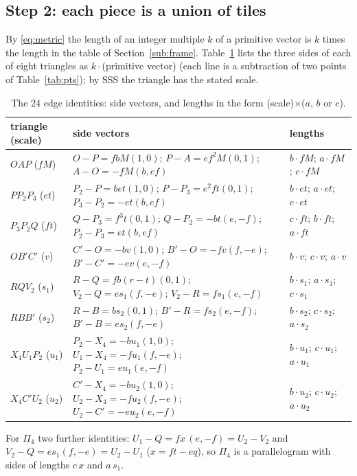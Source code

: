 \documentclass[11pt,reqno]{amsart}
\theoremstyle{plain}
\theoremstyle{definition}
\begin{document}
\subsection{Step 2: each piece is a union of tiles}\label{sub:tiles}
By \eqref{eq:metric} the length of an integer multiple $k$ of a primitive vector is $k$ times the length in the table of Section~\ref{sub:frame}. Table~\ref{tab:sides} lists the three sides of each of eight triangles as $k\cdot$(primitive vector) (each line is a subtraction of two points of Table~\ref{tab:pts}); by SSS the triangle has the stated scale.
\begin{table}[ht]
\centering\small
\caption{The $24$ edge identities: side vectors, and lengths in the form (scale)$\times$($a$, $b$ or $c$).}\label{tab:sides}
\begin{tabular}{@{}p{2.5cm}p{7.2cm}p{2.9cm}@{}}
\toprule
triangle (scale) & side vectors & lengths\\
\midrule
$OAP$ ($fM$) & $O-P=fbM(1,0)$; $P-A=ef^2M(0,1)$; $A-O=-fM(b,ef)$ & $b\cdot fM$; $a\cdot fM$; $c\cdot fM$\\
$PP_2P_3$ ($et$) & $P_2-P=bet(1,0)$; $P-P_3=e^2ft(0,1)$; $P_3-P_2=-et(b,ef)$ & $b\cdot et$; $a\cdot et$; $c\cdot et$\\
$P_3P_2Q$ ($ft$) & $Q-P_3=f^3t(0,1)$; $Q-P_2=-bt(e,-f)$; $P_2-P_3=et(b,ef)$ & $c\cdot ft$; $b\cdot ft$; $a\cdot ft$\\
$OB'C'$ ($v$) & $C'-O=-bv(1,0)$; $B'-O=-fv(f,-e)$; $B'-C'=-ev(e,-f)$ & $b\cdot v$; $c\cdot v$; $a\cdot v$\\
$RQV_2$ ($s_1$) & $R-Q=fb(r-t)(0,1)$; $V_2-Q=es_1(f,-e)$; $V_2-R=fs_1(e,-f)$ & $b\cdot s_1$; $a\cdot s_1$; $c\cdot s_1$\\
$RBB'$ ($s_2$) & $R-B=bs_2(0,1)$; $B'-R=fs_2(e,-f)$; $B'-B=es_2(f,-e)$ & $b\cdot s_2$; $c\cdot s_2$; $a\cdot s_2$\\
$X_4U_1P_2$ ($u_1$) & $P_2-X_4=-bu_1(1,0)$; $U_1-X_4=-fu_1(f,-e)$; $P_2-U_1=eu_1(e,-f)$ & $b\cdot u_1$; $c\cdot u_1$; $a\cdot u_1$\\
$X_4C'U_2$ ($u_2$) & $C'-X_4=-bu_2(1,0)$; $U_2-X_4=-fu_2(f,-e)$; $U_2-C'=-eu_2(e,-f)$ & $b\cdot u_2$; $c\cdot u_2$; $a\cdot u_2$\\
\bottomrule
\end{tabular}
\end{table}
For $\Pi_4$ two further identities: $U_1-Q=fx\,(e,-f)=U_2-V_2$ and $V_2-Q=es_1(f,-e)=U_2-U_1$ ($x=ft-eq$), so $\Pi_4$ is a parallelogram with sides of lengths $c\,x$ and $a\,s_1$.
\end{document}
